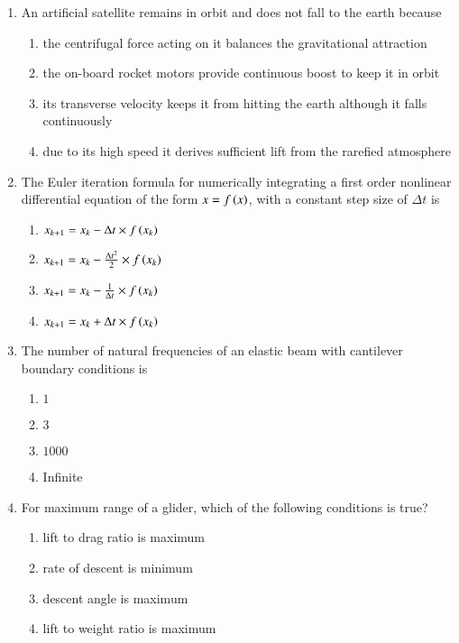 \documentclass[journal]{IEEEtran}
\begin{document}
\begin{enumerate}
\item An artificial satellite remains in orbit and does not fall to the earth because
\begin{enumerate}
\item the centrifugal force acting on it balances the gravitational attraction 
\item the on-board rocket motors provide continuous boost to keep it in orbit
\item its transverse velocity keeps it from hitting the earth although it falls continuously 
\item due to its high speed it derives sufficient lift from the rarefied atmosphere
\end{enumerate}


\item The Euler iteration formula for numerically integrating a first order nonlinear differential equation of the form $x=f\left(x\right)$, with a constant step size of $\Delta t$ is
\begin{multicols}{2}
\begin{enumerate}
\item $x_{k+1}=x_{k}-\Delta t\times f\left(x_{k}\right)$
\item $x_{k+1}=x_{k}-\frac{\Delta t^{2}}{2}\times f\left(x_{k}\right)$
\item $x_{k+1}=x_{k}-\frac{1}{\Delta t}\times f\left(x_{k}\right)$
\item $x_{k+1}=x_{k}+\Delta t\times f\left(x_{k}\right)$
\end{enumerate}
\end{multicols}


\item The number of natural frequencies of an elastic beam with cantilever boundary conditions is
\begin{multicols}{2}
\begin{enumerate}
\item $1$
\item $3$
\item $1000$
\item Infinite
\end{enumerate}
\end{multicols}


\item For maximum range of a glider, which of the following conditions is true?
\begin{multicols}{2}
\begin{enumerate}
\item lift to drag ratio is maximum
\item rate of descent is minimum
\item descent angle is maximum
\item lift to weight ratio is maximum
\end{enumerate}
\end{multicols}



\end{enumerate}
\end{document}
